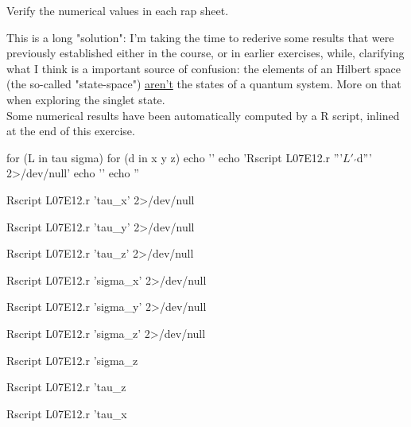 \documentclass[solutions.tex]{subfiles}
\begin{document}
\maketitle
\begin{exercise} Verify the numerical values in each rap sheet.
\end{exercise}

\begin{remark} This is a long "solution": I'm taking the time to
rederive some results that were previously established either in
the course, or in earlier exercises, while, clarifying what I think
is a important source of confusion: the elements of an Hilbert space
(the so-called "state-space") \underline{aren't} the states of a
quantum system. More on that when exploring the singlet state. \\

Some numerical results have been automatically computed by a R script,
inlined at the end of this exercise.
\end{remark}

\iffalse
for (L in tau sigma) {
	for (d in x y z) {
		echo '\bash[stdoutFile=L07E12/'$L'_'$d'.tex]'
		echo 'Rscript L07E12.r '''$L'_'$d''' 2>/dev/null'
		echo '\END'
		echo ''
	}
}

\bash[stdoutFile=L07E12/tau_x.tex]
Rscript L07E12.r 'tau_x' 2>/dev/null
\END

\bash[stdoutFile=L07E12/tau_y.tex]
Rscript L07E12.r 'tau_y' 2>/dev/null
\END

\bash[stdoutFile=L07E12/tau_z.tex]
Rscript L07E12.r 'tau_z' 2>/dev/null
\END

\bash[stdoutFile=L07E12/sigma_x.tex]
Rscript L07E12.r 'sigma_x' 2>/dev/null
\END

\bash[stdoutFile=L07E12/sigma_y.tex]
Rscript L07E12.r 'sigma_y' 2>/dev/null
\END

\bash[stdoutFile=L07E12/sigma_z.tex]
Rscript L07E12.r 'sigma_z' 2>/dev/null
\END

\bash[stdoutFile=L07E12/sigma_z-tau_z.tex]
Rscript L07E12.r 'sigma_z %
\END

\bash[stdoutFile=L07E12/tau_z-sigma_z.tex]
Rscript L07E12.r 'tau_z %
\END

\bash[stdoutFile=L07E12/tau_x-sigma_x.tex]
Rscript L07E12.r 'tau_x %
\END
\end{document}
